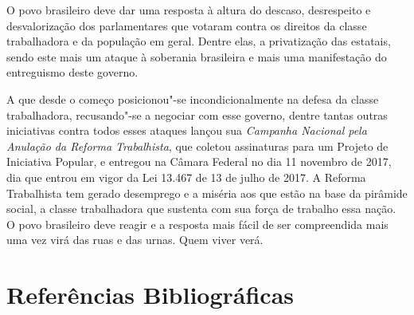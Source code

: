 O povo brasileiro deve dar uma resposta à altura do descaso, desrespeito
e desvalorização dos parlamentares que votaram contra os direitos da
classe trabalhadora e da população em geral. Dentre elas, a privatização
das estatais, sendo este mais um ataque à soberania brasileira e mais
uma manifestação do entreguismo deste governo.

A  que desde o começo posicionou"-se incondicionalmente na defesa da classe trabalhadora, recusando"-se a negociar com esse governo, dentre tantas outras iniciativas contra todos esses ataques lançou sua \emph{Campanha Nacional pela Anulação da Reforma Trabalhista}, que coletou assinaturas para um Projeto de Iniciativa Popular, e entregou na Câmara Federal no dia 11 novembro de 2017, dia que entrou em vigor da Lei 13.467 de 13 de julho de 2017. A Reforma Trabalhista tem gerado desemprego e a miséria aos que estão na base da pirâmide social, a classe trabalhadora que sustenta com sua força de trabalho essa nação. O povo brasileiro deve reagir e a resposta mais fácil de ser compreendida mais uma vez virá das ruas e das urnas. Quem viver verá. 


\section{Referências Bibliográficas}

